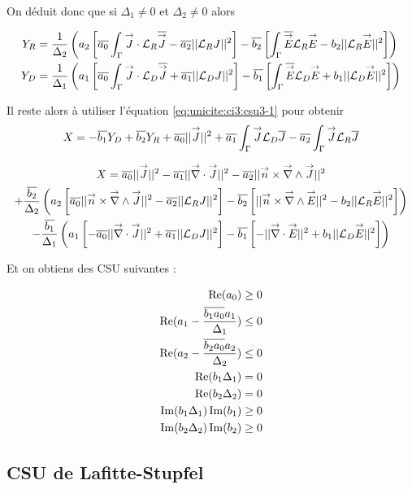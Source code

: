   On déduit donc que si \(\Delta_1 \not = 0\) et \(\Delta_2 \not = 0\) alors

  \begin{align}
    Y_R &= \frac{1}{\Delta_2}\left(a_2\left[\conj{a_0}\int_\Gamma \vJ\cdot\LR\conj{\vJ} - \conj{a_2}||\LR J||^2\right]  -\conj{b_2}\left[\int_\Gamma \conj{\vE}\LR{\vE} - b_2 ||\LR \vE ||^2\right]\right) \\
    Y_D &= \frac{1}{\Delta_1}\left(a_1\left[\conj{a_0}\int_\Gamma \vJ\cdot\LD\conj{\vJ} + \conj{a_1}||\LD J||^2\right]  -\conj{b_1}\left[\int_\Gamma \conj{\vE}\LD{\vE} + b_1 ||\LD \vE ||^2\right]\right)
  \end{align}

  Il reste alors à utiliser l'équation \eqref{eq:unicite:ci3:csu3-1} pour obtenir
  \begin{equation}
    X = -\conj{b_1} Y_D + \conj{b_2} Y_R + \conj{a_0} || \vJ ||^2 + \conj{a_1} \int_\Gamma \vJ \LD \conj{J} - \conj{a_2} \int_\Gamma \vJ \LR \conj{J}
  \end{equation}

  \begin{multline}
    X = \conj{a_0} || \vJ ||^2 - \conj{a_1} || \vdiv \vJ ||^2 - \conj{a_2} || \vn \times \vrot \vJ ||^2\\
    + \frac{\conj{b_2}}{\Delta_2}\left(a_2\left[\conj{a_0}||\vn \times \vrot \vJ||^2 - \conj{a_2}||\LR J||^2\right]  -\conj{b_2}\left[||\vn\times\vrot\vE||^2 - b_2 ||\LR \vE ||^2\right]\right) \\
    - \frac{\conj{b_1}}{\Delta_1}\left(a_1\left[-\conj{a_0}||\vdiv\vJ||^2 + \conj{a_1}||\LD J||^2\right]  -\conj{b_1}\left[-||\vdiv\vE||^2 + b_1 ||\LD \vE ||^2\right]\right)
  \end{multline}

  Et on obtiens des CSU suivantes :

  \begin{align}
    \Re(a_0)\ge 0 \\
    \Re(a_1 - \frac{\conj{b_1a_0}a_1}{\Delta_1}) \le 0 \\
    \Re(a_2 - \frac{\conj{b_2a_0}a_2}{\Delta_2}) \le 0 \\
    \Re(b_1\Delta_1) = 0 \\
    \Re(b_2\Delta_2) = 0 \\
    \Im(b_1\Delta_1)\Im(b_1)\ge 0\\
    \Im(b_2\Delta_2)\Im(b_2)\ge 0
  \end{align}

\subsection{CSU de Lafitte-Stupfel}

